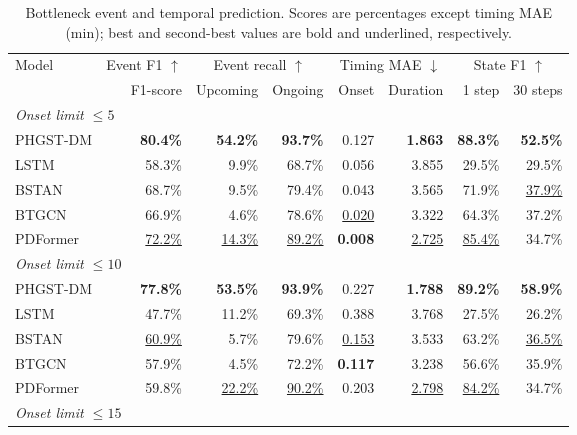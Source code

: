 \begin{table}[!htbp]
\centering
\caption{Bottleneck event and temporal prediction. Scores are percentages except timing MAE (min); best and second-best values are bold and underlined, respectively.}
\label{tab:comparison-main}
\footnotesize
\setlength{\tabcolsep}{3.2pt}
\renewcommand{\arraystretch}{1.12}
\begin{fittable}
\begin{tabular*}{\linewidth}{@{\extracolsep{\fill}}lrrrrrrr@{}}
\toprule
Model & \multicolumn{1}{c}{Event F1 $\uparrow$} & \multicolumn{2}{c}{Event recall $\uparrow$} & \multicolumn{2}{c}{Timing MAE $\downarrow$} & \multicolumn{2}{c}{State F1 $\uparrow$} \\
\cmidrule(lr){2-2}\cmidrule(lr){3-4}\cmidrule(lr){5-6}\cmidrule(l){7-8}
 & F1-score & Upcoming & Ongoing & Onset & Duration & 1 step & 30 steps \\
\midrule
\multicolumn{8}{l}{\textit{Onset limit $\leq5$}} \\
PHGST-DM & \textbf{80.4\%} & \textbf{54.2\%} & \textbf{93.7\%} & 0.127 & \textbf{1.863} & \textbf{88.3\%} & \textbf{52.5\%} \\
LSTM & 58.3\% & 9.9\% & 68.7\% & 0.056 & 3.855 & 29.5\% & 29.5\% \\
BSTAN & 68.7\% & 9.5\% & 79.4\% & 0.043 & 3.565 & 71.9\% & \underline{37.9\%} \\
BTGCN & 66.9\% & 4.6\% & 78.6\% & \underline{0.020} & 3.322 & 64.3\% & 37.2\% \\
PDFormer & \underline{72.2\%} & \underline{14.3\%} & \underline{89.2\%} & \textbf{0.008} & \underline{2.725} & \underline{85.4\%} & 34.7\% \\
\midrule
\multicolumn{8}{l}{\textit{Onset limit $\leq10$}} \\
PHGST-DM & \textbf{77.8\%} & \textbf{53.5\%} & \textbf{93.9\%} & 0.227 & \textbf{1.788} & \textbf{89.2\%} & \textbf{58.9\%} \\
LSTM & 47.7\% & 11.2\% & 69.3\% & 0.388 & 3.768 & 27.5\% & 26.2\% \\
BSTAN & \underline{60.9\%} & 5.7\% & 79.6\% & \underline{0.153} & 3.533 & 63.2\% & \underline{36.5\%} \\
BTGCN & 57.9\% & 4.5\% & 72.2\% & \textbf{0.117} & 3.238 & 56.6\% & 35.9\% \\
PDFormer & 59.8\% & \underline{22.2\%} & \underline{90.2\%} & 0.203 & \underline{2.798} & \underline{84.2\%} & 34.7\% \\
\midrule
\multicolumn{8}{l}{\textit{Onset limit $\leq15$}} \\

\end{tabular*}
\end{fittable}
\end{table}
